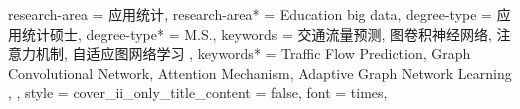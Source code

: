 {{      %
    research-area = {应用统计},
    research-area* = {Education big data},
    degree-type = {应用统计硕士},
    degree-type* = {M.S.},
    keywords = {
      交通流量预测,
      图卷积神经网络,
      注意力机制,
      自适应图网络学习
    },
    keywords* = {
      Traffic Flow Prediction,
      Graph Convolutional Network,
      Attention Mechanism,
      Adaptive Graph Network Learning
    },
  },
  style = {
    cover_ii_only_title_content = false,
    font = times,
}}
